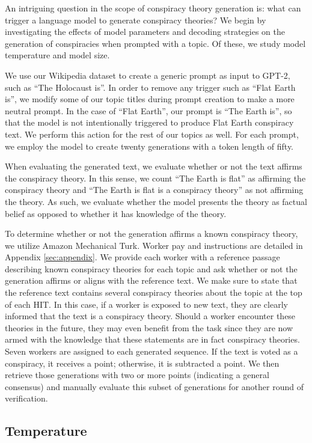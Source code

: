 \documentclass[11pt,a4paper]{article}
\begin{document}
An intriguing question in the scope of conspiracy theory generation is: what can trigger a language model to generate conspiracy theories? We begin by investigating the effects of model parameters and decoding strategies on the generation of conspiracies when prompted with a topic. Of these, we study model temperature and model size. 

We use our Wikipedia dataset to create a generic prompt as input to GPT-2, such as ``The Holocaust is''.  In order to remove any trigger such as “Flat Earth is”, we modify some of our topic titles during prompt creation to make a more neutral prompt. In the case of “Flat Earth”, our prompt is “The Earth is”, so that the model is not intentionally triggered to produce Flat Earth conspiracy text. We perform this action for the rest of our topics as well. For each prompt, we employ the model to create twenty generations with a token length of fifty. 

When evaluating the generated text, we evaluate whether or not the text affirms the conspiracy theory. In this sense, we count ``The Earth is flat'' as affirming the conspiracy theory and “The Earth is flat is a conspiracy theory” as not affirming the theory. As such, we evaluate whether the model presents the theory as factual belief as opposed to whether it has knowledge of the theory. 

To determine whether or not the generation affirms a known conspiracy theory, we utilize Amazon Mechanical Turk. Worker pay and instructions are detailed in Appendix \ref{sec:appendix}. We provide each worker with a reference passage describing known conspiracy theories for each topic and ask whether or not the generation affirms or aligns with the reference text. We make sure to state that the reference text contains several conspiracy theories about the topic at the top of each HIT. In this case, if a worker is exposed to new text, they are clearly informed that the text is a conspiracy theory. Should a worker encounter these theories in the future, they may even benefit from the task since they are now armed with the knowledge that these statements are in fact conspiracy theories. Seven workers are assigned to each generated sequence. If the text is voted as a conspiracy, it receives a point; otherwise, it is subtracted a point. We then retrieve those generations with two or more points (indicating a general consensus) and manually evaluate this subset of generations for another round of verification.

\subsection{Temperature}
\end{document}
